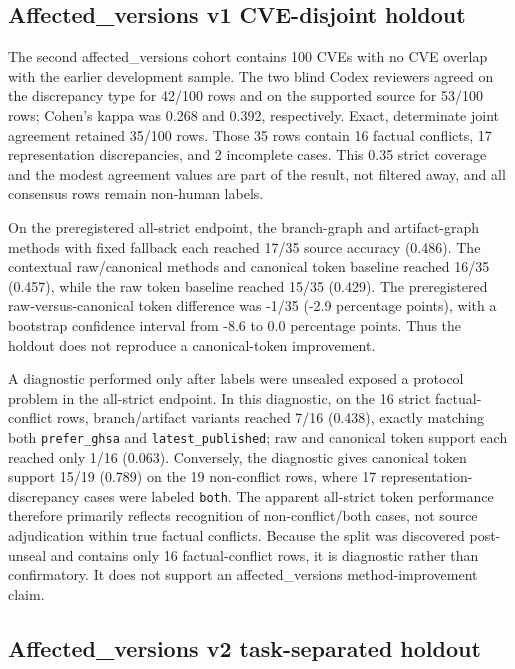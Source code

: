 \subsection{Affected\_versions v1 CVE-disjoint holdout}

The second affected\_versions cohort contains 100 CVEs with no CVE overlap with the earlier development sample. The two blind Codex reviewers agreed on the discrepancy type for 42/100 rows and on the supported source for 53/100 rows; Cohen's kappa was 0.268 and 0.392, respectively. Exact, determinate joint agreement retained 35/100 rows. Those 35 rows contain 16 factual conflicts, 17 representation discrepancies, and 2 incomplete cases. This 0.35 strict coverage and the modest agreement values are part of the result, not filtered away, and all consensus rows remain non-human labels.

On the preregistered all-strict endpoint, the branch-graph and artifact-graph methods with fixed fallback each reached 17/35 source accuracy (0.486). The contextual raw/canonical methods and canonical token baseline reached 16/35 (0.457), while the raw token baseline reached 15/35 (0.429). The preregistered raw-versus-canonical token difference was -1/35 (-2.9 percentage points), with a bootstrap confidence interval from -8.6 to 0.0 percentage points. Thus the holdout does not reproduce a canonical-token improvement.

A diagnostic performed only after labels were unsealed exposed a protocol problem in the all-strict endpoint. In this diagnostic, on the 16 strict factual-conflict rows, branch/artifact variants reached 7/16 (0.438), exactly matching both \texttt{prefer\_ghsa} and \texttt{latest\_published}; raw and canonical token support each reached only 1/16 (0.063). Conversely, the diagnostic gives canonical token support 15/19 (0.789) on the 19 non-conflict rows, where 17 representation-discrepancy cases were labeled \texttt{both}. The apparent all-strict token performance therefore primarily reflects recognition of non-conflict/both cases, not source adjudication within true factual conflicts. Because the split was discovered post-unseal and contains only 16 factual-conflict rows, it is diagnostic rather than confirmatory. It does not support an affected\_versions method-improvement claim.

\subsection{Affected\_versions v2 task-separated holdout}

